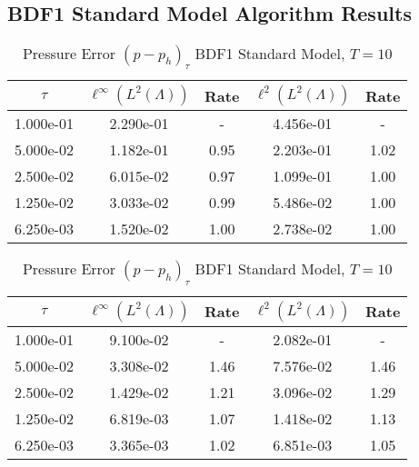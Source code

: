 \documentclass[letterpaper]{erdc}
\begin{document}
\subsection{BDF1 Standard Model Algorithm Results}
\begin{table}[h!]
  \parbox{.45\linewidth}{
  \tiny
  \centering
    \caption{Density Error $(\rho - \rho_h)_{\tau}$ BDF1 Standard Model, $T=10$}
    \begin{tabular}{c|c|c|c|c}\label{table:firstconvergenceresult}
      $\tau$  & $\ell^{\infty}\left(L^2(\Lambda)\right)$ &  Rate  &  $\ell^2\left(L^2(\Lambda)\right)$  &  Rate\\
      \hline
      1.000e-01 & 2.290e-01 &  -   & 4.456e-01 &  -  \\
      5.000e-02 & 1.182e-01 & 0.95 & 2.203e-01 & 1.02\\
      2.500e-02 & 6.015e-02 & 0.97 & 1.099e-01 & 1.00\\
      1.250e-02 & 3.033e-02 & 0.99 & 5.486e-02 & 1.00\\
      6.250e-03 & 1.520e-02 & 1.00 & 2.738e-02 & 1.00
    \end{tabular}
    }
    \hfill
    \parbox{.45\linewidth}{
      \tiny
      \centering
        \caption{Pressure Error $(p - p_h)_{\tau}$ BDF1 Standard Model, $T=10$}
        \begin{tabular}{c|c|c|c|c}
          $\tau$ &  $\ell^{\infty}\left(L^2(\Lambda)\right)$ &  Rate  &  $\ell^2\left(L^2(\Lambda)\right)$  &  Rate\\
          \hline
          1.000e-01 & 9.100e-02 &  -   & 2.082e-01 &  -  \\
          5.000e-02 & 3.308e-02 & 1.46 & 7.576e-02 & 1.46\\
          2.500e-02 & 1.429e-02 & 1.21 & 3.096e-02 & 1.29\\
          1.250e-02 & 6.819e-03 & 1.07 & 1.418e-02 & 1.13\\
          6.250e-03 & 3.365e-03 & 1.02 & 6.851e-03 & 1.05
        \end{tabular}
    }
\end{table}
\end{document}
